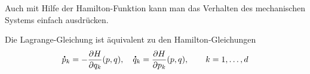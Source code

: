 \documentclass[german]{scrreprt}
\theoremstyle{plain}
\theoremstyle{nonumberplain}
\theoremstyle{nonumberplain}
\theoremstyle{nonumberplain}
\newtheorem{proof}{Beweis}
\renewcommand*{\dot}[1]{\accentset{\mbox{\large\bfseries .}}{#1}}
\begin{document}
Auch mit Hilfe der Hamilton-Funktion kann man das Verhalten des mechanischen Systems einfach ausdrücken.

\begin{satz}
	Die Lagrange-Gleichung ist äquivalent zu den Hamilton-Gleichungen
	\begin{equation*}
	\dot p_k = -\frac{\partial H}{\partial q_k}(p, q),
	\quad
	\dot q_k = \frac{\partial H}{\partial p_k}(p, q),
	\qquad
	k = 1, \dots, d
	\end{equation*}
\end{satz}
%
%
\end{document}
